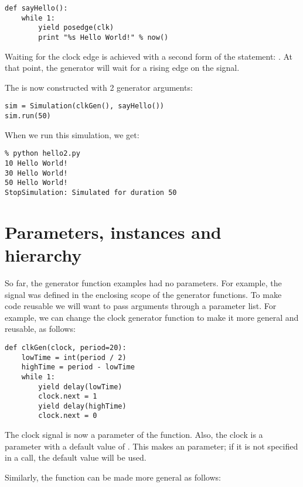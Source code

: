 \begin{verbatim}
def sayHello():
    while 1:
        yield posedge(clk)
        print "%s Hello World!" % now()
\end{verbatim}

Waiting for the clock edge is achieved with a second form of the
 statement: . 
At that point, the generator will
wait for a rising edge on the signal.

The  is now constructed with 2 generator arguments:

\begin{verbatim}
sim = Simulation(clkGen(), sayHello())
sim.run(50)
\end{verbatim}

When we run this simulation, we get:

\begin{verbatim}
% python hello2.py
10 Hello World!
30 Hello World!
50 Hello World!
StopSimulation: Simulated for duration 50
\end{verbatim}


\section{Parameters, instances and hierarchy \label{intro-hier}}

So far, the generator function examples had no parameters. For
example, the  signal was defined in the enclosing scope of
the generator functions. To make code reusable we will
want to pass arguments through a parameter list. For example, we can
change the clock generator function to make it more general
and reusable, as follows:

\begin{verbatim}
def clkGen(clock, period=20):
    lowTime = int(period / 2)
    highTime = period - lowTime
    while 1:
        yield delay(lowTime)
        clock.next = 1
        yield delay(highTime)
        clock.next = 0
\end{verbatim}

The clock signal is now a parameter of the function. Also, the clock
 is a parameter with a default value of .
This makes  an  parameter; if it is not
specified in a call, the default value will be used.

Similarly, the  function can be made more general as follows:

